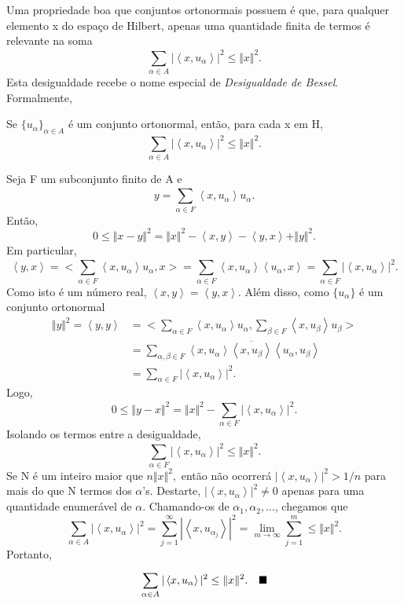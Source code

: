 \documentclass[measure_theory.tex]{subfiles}
\begin{document}
Uma propriedade boa que conjuntos ortonormais possuem é que, para qualquer elemento x do espaço de Hilbert, apenas uma quantidade finita de termos é relevante na soma
\[
	\sum\limits_{\alpha \in A}^{}|\left< x, u_{\alpha } \right>|^{2}\leq \Vert x \Vert^{2}.
\]
Esta desigualdade recebe o nome especial de \hypertarget{bessel_inequality}{\textit{Desigualdade de Bessel}}. Formalmente,
\begin{prop*}
	Se \(\{u_{\alpha }\}_{\alpha \in A}\) é um conjunto ortonormal, então, para cada x em H,
	\[
		\sum\limits_{\alpha \in A}^{}|\left< x, u_{\alpha } \right>|^{2}\leq \Vert x \Vert^{2}.
	\]
\end{prop*}
\begin{proof*}
	Seja F um subconjunto finito de A e
	\[
		y = \sum\limits_{\alpha \in F}^{}\left< x, u_{\alpha } \right>u_{\alpha }.
	\]
	Então,
	\[
		0 \leq \Vert x-y \Vert^{2} = \Vert x \Vert^{2}-\left< x, y \right> - \left< y, x \right> + \Vert y \Vert^{2}.
	\]
	Em particular,
	\[
		\left< y, x \right> = \biggl< \sum\limits_{\alpha\in F }^{}\left< x, u_{\alpha } \right>u_{\alpha }, x \biggr> = \sum\limits_{\alpha \in F}^{}\left< x, u_{\alpha } \right>\left< u_{\alpha }, x \right> = \sum\limits_{\alpha \in F}^{}|\left< x, u_{\alpha } \right>|^{2}.
	\]
	Como isto é um número real, \(\left< x, y \right> = \left< y, x \right>\). Além disso, como \(\{u_{\alpha }\}\) é um conjunto ortonormal
	\begin{align*}
		\Vert y \Vert^{2} = \left< y, y \right> & = \biggl<\sum\limits_{\alpha \in F}^{}\left< x, u_{\alpha } \right>u_{\alpha } , \sum\limits_{\beta \in F}^{}\left< x, u_{\beta } \right>u_{\beta } \biggr> \\
		                                        & = \sum\limits_{\alpha , \beta \in F}^{}\left< x, u_{\alpha } \right>\overline{\left< x, u_{\beta } \right>}\left< u_{\alpha }, u_{\beta } \right>           \\
		                                        & = \sum\limits_{\alpha \in F}^{}|\left< x, u_{\alpha } \right>|^{2}.
	\end{align*}
	Logo,
	\[
		0\leq \Vert y-x \Vert^{2} = \Vert x \Vert^{2} - \sum\limits_{\alpha \in F}^{}|\left< x, u_{\alpha } \right>|^{2}.
	\]
	Isolando os termos entre a desigualdade,
	\[
		\sum\limits_{\alpha \in F}^{}|\left< x, u_{\alpha } \right>|^{2}\leq \Vert x \Vert^{2}.
	\]
	Se N é um inteiro maior que \(n \Vert x \Vert^{2},\) então não ocorrerá \(|\left< x, u_{\alpha } \right>|^{2}> 1/n\) para mais do que N termos dos \(\alpha \)'s. Destarte,
	\(|\left< x, u_{\alpha } \right>|^{2}\neq 0\) apenas para uma quantidade enumerável de \(\alpha \). Chamando-os de \(\alpha _1, \alpha _2, \dotsc \), chegamos que
	\[
		\sum\limits_{\alpha \in A}^{}|\left< x, u_{\alpha } \right>|^{2} = \sum\limits_{j=1}^{\infty}|\left< x, u_{\alpha_{j}} \right>|^{2} = \lim_{m\to \infty}\sum\limits_{j=1}^{m} \leq \Vert x \Vert^{2}.
	\]
	Portanto,
	\[
		\sum\limits_{\alpha \in A}^{}|\left< x, u_{\alpha } \right>|^{2} \leq \Vert x \Vert^{2}.\quad \text{$\blacksquare$}
	\]
\end{proof*}
\end{document}
